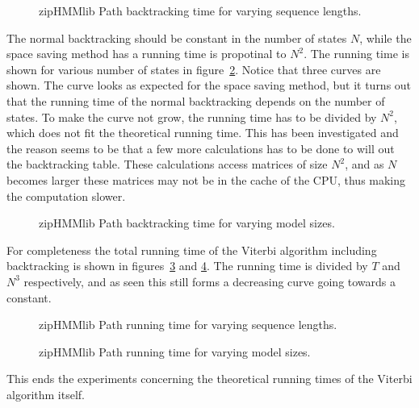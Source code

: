 \begin{figure}
  \centering
  
  \caption{zipHMMlib Path backtracking time for varying sequence lengths.}
  \label{fig:assymptotic_viterbi_backtrack_n}
\end{figure}

The normal backtracking should be constant in the number of states $N$, while
the space saving method has a running time is propotinal to $N^2$. The running
time is shown for various number of states in
figure~\ref{fig:assymptotic_viterbi_backtrack_k}. Notice that three curves are
shown. The curve looks as expected for the space saving method, but it turns
out that the running time of the normal backtracking depends on the number of
states. To make the curve not grow, the running time has to be divided by
$N^2$, which does not fit the theoretical running time. This has been
investigated and the reason seems to be that a few more calculations has to be
done to will out the backtracking table. These calculations access matrices of
size $N^2$, and as $N$ becomes larger these matrices may not be in the cache of
the CPU, thus making the computation slower. 

\begin{figure}
  \centering
  
  \caption{zipHMMlib Path backtracking time for varying model sizes.}
  \label{fig:assymptotic_viterbi_backtrack_k}
\end{figure}

For completeness the total running time of the Viterbi algorithm including
backtracking is shown in figures~\ref{fig:assymptotic_viterbi_path_n} and
\ref{fig:assymptotic_viterbi_path_k}. The running time is divided by $T$ and
$N^3$ respectively, and as seen this still forms a decreasing curve going
towards a constant.

\begin{figure}
  \centering
  
  \caption{zipHMMlib Path running time for varying sequence lengths.}
  \label{fig:assymptotic_viterbi_path_n}
\end{figure}

\begin{figure}
  \centering
  
  \caption{zipHMMlib Path running time for varying model sizes.}
  \label{fig:assymptotic_viterbi_path_k}
\end{figure}

This ends the experiments concerning the theoretical running times of the
Viterbi algorithm itself.

